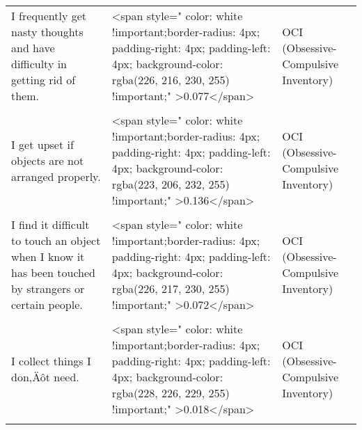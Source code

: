 \documentclass[border=1mm]{standalone}
\begin{document}
\begin{longtable}{lll}
\addlinespace
I frequently get nasty thoughts and have difficulty in getting rid of them. & <span style="     color: white !important;border-radius: 4px; padding-right: 4px; padding-left: 4px; background-color: rgba(226, 216, 230, 255) !important;" >0.077</span> & OCI (Obsessive-Compulsive Inventory)\\
\cellcolor{gray!10}{I check things more often than necessary.} & \cellcolor{gray!10}{<span style="     color: white !important;border-radius: 4px; padding-right: 4px; padding-left: 4px; background-color: rgba(227, 221, 230, 255) !important;" >0.049</span>} & \cellcolor{gray!10}{OCI (Obsessive-Compulsive Inventory)}\\
I get upset if objects are not arranged properly. & <span style="     color: white !important;border-radius: 4px; padding-right: 4px; padding-left: 4px; background-color: rgba(223, 206, 232, 255) !important;" >0.136</span> & OCI (Obsessive-Compulsive Inventory)\\
\cellcolor{gray!10}{I feel compelled to count while I am doing things.} & \cellcolor{gray!10}{<span style="     color: white !important;border-radius: 4px; padding-right: 4px; padding-left: 4px; background-color: rgba(226, 218, 230, 255) !important;" >0.062</span>} & \cellcolor{gray!10}{OCI (Obsessive-Compulsive Inventory)}\\
I find it difficult to touch an object when I know it has been touched by strangers or certain people. & <span style="     color: white !important;border-radius: 4px; padding-right: 4px; padding-left: 4px; background-color: rgba(226, 217, 230, 255) !important;" >0.072</span> & OCI (Obsessive-Compulsive Inventory)\\
\addlinespace
\cellcolor{gray!10}{I find it difficult to control my own thoughts.} & \cellcolor{gray!10}{<span style="     color: white !important;border-radius: 4px; padding-right: 4px; padding-left: 4px; background-color: rgba(224, 209, 231, 255) !important;" >0.119</span>} & \cellcolor{gray!10}{OCI (Obsessive-Compulsive Inventory)}\\
I collect things I don‚Äôt need. & <span style="     color: white !important;border-radius: 4px; padding-right: 4px; padding-left: 4px; background-color: rgba(228, 226, 229, 255) !important;" >0.018</span> & OCI (Obsessive-Compulsive Inventory)\\
\cellcolor{gray!10}{I repeatedly check doors, windows, drawers, etc.} & \cellcolor{gray!10}{<span style="     color: white !important;border-radius: 4px; padding-right: 4px; padding-left: 4px; background-color: rgba(227, 221, 230, 255) !important;" >0.047</span>} & \cellcolor{gray!10}{OCI (Obsessive-Compulsive Inventory)}\\

\end{longtable}
\end{document}

